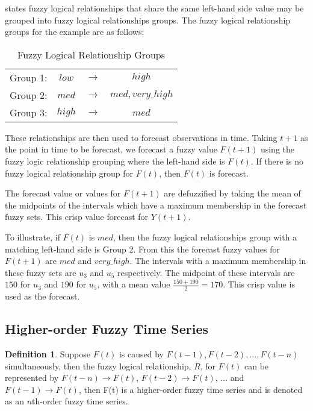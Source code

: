 \documentclass{article}
\theoremstyle{definition}
\newtheorem{ftsdef}{Definition}
\begin{document}
 states fuzzy logical relationships that share the same left-hand side value may be grouped into fuzzy logical relationships groups. The fuzzy logical relationship groups for the example are as follows:

\begin{table}[h]
	\center
	\begin{tabular}{ c c c c }
  	Group 1: & $low$ & $\rightarrow$ & $high$ \\
  	Group 2: & $med$ & $\rightarrow$ & $med, very\_high$ \\
  	Group 3: & $high$ & $\rightarrow$ & $med$ \\
	\end{tabular}
	\caption{Fuzzy Logical Relationship Groups}
\end{table}

These relationships are then used to forecast observations in time. Taking $t+1$ as the point in time to be forecast, we forecast a fuzzy value $F(t+1)$ using the fuzzy logic relationship grouping where the left-hand side is $F(t)$. If there is no fuzzy logical relationship group for $F(t)$, then $F(t)$ is forecast.

The forecast value or values for $F(t+1)$ are defuzzified by taking the mean of the midpoints of the intervals which have a maximum membership in the forecast fuzzy sets. This crisp value forecast for $Y(t+1)$.

To illustrate, if $F(t)$ is $med$, then the fuzzy logical relationships group with a matching left-hand side is Group 2. From this the forecast fuzzy values for $F(t+1)$ are $med$ and $very\_high$. The intervals with a maximum membership in these fuzzy sets are $u_3$ and $u_5$ respectively. The midpoint of these intervals are $150$ for $u_3$ and $190$ for $u_5$, with a mean value $\frac{150 + 190}{2}=170$. This crisp value is used as the forecast.

\subsection{Higher-order Fuzzy Time Series}

\begin{ftsdef}
\label{def5}
Suppose $F(t)$ is caused by $F(t-1),F(t-2),\ldots,F(t-n)$ simultaneously, then the fuzzy logical relationship, $R$, for $F(t)$ can be represented by $F(t-n)\rightarrow F(t)$, $F(t-2) \rightarrow F(t)$, $\ldots$ and $F(t-1) \rightarrow F(t)$, then F(t) is a higher-order fuzzy time series and is denoted as an $n$th-order fuzzy time series.
\end{ftsdef}
\end{document}
